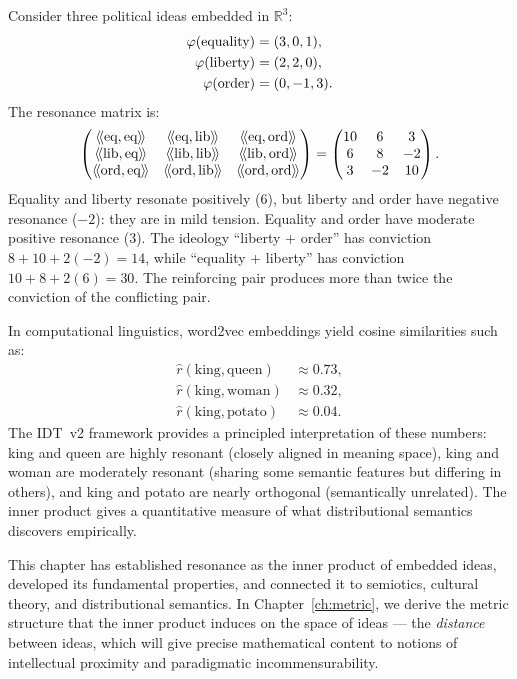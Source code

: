 \begin{example}
\label{ex:political-resonance}
Consider three political ideas embedded in $\mathbb{R}^3$:
\begin{align*}
  \varphi(\text{equality}) &= (3, 0, 1), \\
  \varphi(\text{liberty}) &= (2, 2, 0), \\
  \varphi(\text{order}) &= (0, -1, 3).
\end{align*}
The resonance matrix is:
\[
  \begin{pmatrix}
    \rs{\text{eq}}{\text{eq}} & \rs{\text{eq}}{\text{lib}} &
    \rs{\text{eq}}{\text{ord}} \\
    \rs{\text{lib}}{\text{eq}} & \rs{\text{lib}}{\text{lib}} &
    \rs{\text{lib}}{\text{ord}} \\
    \rs{\text{ord}}{\text{eq}} & \rs{\text{ord}}{\text{lib}} &
    \rs{\text{ord}}{\text{ord}}
  \end{pmatrix}
  =
  \begin{pmatrix}
    10 & 6 & 3 \\
    6 & 8 & -2 \\
    3 & -2 & 10
  \end{pmatrix}.
\]
Equality and liberty resonate positively (6), but liberty and order have
negative resonance ($-2$): they are in mild tension. Equality and order have
moderate positive resonance (3). The ideology ``liberty + order'' has conviction
$8 + 10 + 2(-2) = 14$, while ``equality + liberty'' has conviction
$10 + 8 + 2(6) = 30$. The reinforcing pair produces more than twice the
conviction of the conflicting pair.
\end{example}

\begin{example}
\label{ex:cosine}
In computational linguistics, word2vec embeddings yield cosine similarities such
as:
\begin{align*}
  \hat{r}(\text{king}, \text{queen}) &\approx 0.73, \\
  \hat{r}(\text{king}, \text{woman}) &\approx 0.32, \\
  \hat{r}(\text{king}, \text{potato}) &\approx 0.04.
\end{align*}
The IDT~v2 framework provides a principled interpretation of these numbers:
king and queen are highly resonant (closely aligned in meaning space), king and
woman are moderately resonant (sharing some semantic features but differing in
others), and king and potato are nearly orthogonal (semantically unrelated). The
inner product gives a quantitative measure of what distributional semantics
discovers empirically.
\end{example}

\bigskip

This chapter has established resonance as the inner product of embedded ideas,
developed its fundamental properties, and connected it to semiotics, cultural
theory, and distributional semantics. In Chapter~\ref{ch:metric}, we derive the
metric structure that the inner product induces on the space of ideas --- the
\emph{distance} between ideas, which will give precise mathematical content to
notions of intellectual proximity and paradigmatic incommensurability.
